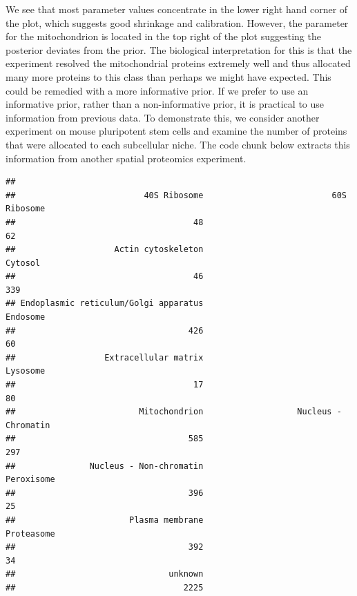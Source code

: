 \documentclass[
]{article}
\newenvironment{Shaded}{\begin{snugshade}}{\end{snugshade}}
\newcommand{\KeywordTok}[1]{\textcolor[rgb]{0.13,0.29,0.53}{\textbf{#1}}}
\newcommand{\NormalTok}[1]{#1}
\newcommand{\OperatorTok}[1]{\textcolor[rgb]{0.81,0.36,0.00}{\textbf{#1}}}
\newcommand{\StringTok}[1]{\textcolor[rgb]{0.31,0.60,0.02}{#1}}
\begin{document}
We see that most parameter values concentrate in the lower right hand
corner of the plot, which suggests good shrinkage and calibration.
However, the parameter for the mitochondrion is located in the top right
of the plot suggesting the posterior deviates from the prior. The
biological interpretation for this is that the experiment resolved the
mitochondrial proteins extremely well and thus allocated many more
proteins to this class than perhaps we might have expected. This could
be remedied with a more informative prior. If we prefer to use an
informative prior, rather than a non-informative prior, it is practical
to use information from previous data. To demonstrate this, we consider
another experiment on mouse pluripotent stem cells and examine the
number of proteins that were allocated to each subcellular niche. The
code chunk below extracts this information from another spatial
proteomics experiment.

\begin{Shaded}
\end{Shaded}

\begin{verbatim}
## 
##                          40S Ribosome                          60S Ribosome 
##                                    48                                    62 
##                    Actin cytoskeleton                               Cytosol 
##                                    46                                   339 
## Endoplasmic reticulum/Golgi apparatus                              Endosome 
##                                   426                                    60 
##                  Extracellular matrix                              Lysosome 
##                                    17                                    80 
##                         Mitochondrion                   Nucleus - Chromatin 
##                                   585                                   297 
##               Nucleus - Non-chromatin                            Peroxisome 
##                                   396                                    25 
##                       Plasma membrane                            Proteasome 
##                                   392                                    34 
##                               unknown 
##                                  2225
\end{verbatim}
\end{document}
